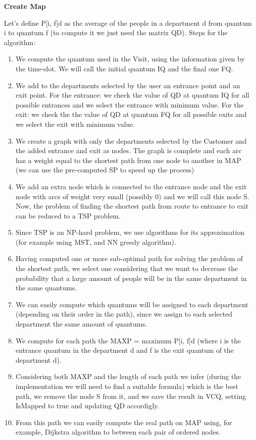 \documentclass[a4paper, 12pt, oneside, table]{article}
\begin{document}
\vspace{0.4em}
\textbf{Create Map} \newline
\vspace{0.4em}

Let's define P[i, f]d as the average of the people in a department d from quantum i to quantum f (to compute it we just need the matrix QD).\newline
Steps for the algorithm:
\begin{enumerate}
    \item We compute the quantum used in the Visit, using the information given by the time-slot. We will call the initial quantum IQ and the final one FQ.
    \item We add to the departments selected by the user an entrance point and an exit point. For the entrance: we check the value of QD at quantum IQ for all possible entrances and we select the entrance with minimum value. For the exit: we check the the value of QD at quantum FQ for all possible exits and we select the exit with minimum value.
    \item We create a graph with only the departments selected by the Customer and the added entrance and exit as nodes. The graph is complete and each arc has a weight equal to the shortest path from one node to another in MAP (we can use the pre-computed SP to speed up the process)
    \item We add an extra node which is connected to the entrance node and the exit node with arcs of weight very small (possibly 0) and we will call this node S. Now, the problem of finding the shortest path from route to entrance to exit can be reduced to a TSP problem.
    \item Since TSP is an NP-hard problem, we use algorithms for its approximation (for example using MST, and NN greedy algorithm).
    \item Having computed one or more sub-optimal path for solving the problem of the shortest path, we select one considering that we want to decrease the probability that a large amount of people will be in the same department in the same quantums.
    \item We can easily compute which quantums will be assigned to each department (depending on their order in the path), since we assign to each selected department the same amount of quantums.
    \item We compute for each path the MAXP = maximum P[i, f]d (where i is the entrance quantum in the department d and f is the exit quantum of the department d).
    \item Considering both MAXP and the length of each path we infer (during the implementation we will need to find a suitable formula) which is the best path, we remove the node S from it, and we save the result in VCQ, setting IsMapped to true and updating QD accordigly.
    \item From this path we can easily compute the real path on MAP using, for example, Dijkstra algorithm to between each pair of ordered nodes.
\end{enumerate}
\end{document}
